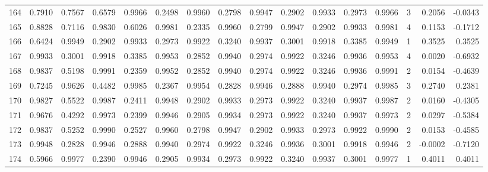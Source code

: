 \begin{tabular}{lrrrrrrrrrrrrrrr}
164 &      0.7910 &  0.7567 &  0.6579 &  0.9966 &  0.2498 &  0.9960 &  0.2798 &  0.9947 &  0.2902 &  0.9933 &   0.2973 &     0.9966 &      3 &                    0.2056 &                    -0.0343 \\
165 &      0.8828 &  0.7116 &  0.9830 &  0.6026 &  0.9981 &  0.2335 &  0.9960 &  0.2799 &  0.9947 &  0.2902 &   0.9933 &     0.9981 &      4 &                    0.1153 &                    -0.1712 \\
166 &      0.6424 &  0.9949 &  0.2902 &  0.9933 &  0.2973 &  0.9922 &  0.3240 &  0.9937 &  0.3001 &  0.9918 &   0.3385 &     0.9949 &      1 &                    0.3525 &                     0.3525 \\
167 &      0.9933 &  0.3001 &  0.9918 &  0.3385 &  0.9953 &  0.2852 &  0.9940 &  0.2974 &  0.9922 &  0.3246 &   0.9936 &     0.9953 &      4 &                    0.0020 &                    -0.6932 \\
168 &      0.9837 &  0.5198 &  0.9991 &  0.2359 &  0.9952 &  0.2852 &  0.9940 &  0.2974 &  0.9922 &  0.3246 &   0.9936 &     0.9991 &      2 &                    0.0154 &                    -0.4639 \\
169 &      0.7245 &  0.9626 &  0.4482 &  0.9985 &  0.2367 &  0.9954 &  0.2828 &  0.9946 &  0.2888 &  0.9940 &   0.2974 &     0.9985 &      3 &                    0.2740 &                     0.2381 \\
170 &      0.9827 &  0.5522 &  0.9987 &  0.2411 &  0.9948 &  0.2902 &  0.9933 &  0.2973 &  0.9922 &  0.3240 &   0.9937 &     0.9987 &      2 &                    0.0160 &                    -0.4305 \\
171 &      0.9676 &  0.4292 &  0.9973 &  0.2399 &  0.9946 &  0.2905 &  0.9934 &  0.2973 &  0.9922 &  0.3240 &   0.9937 &     0.9973 &      2 &                    0.0297 &                    -0.5384 \\
172 &      0.9837 &  0.5252 &  0.9990 &  0.2527 &  0.9960 &  0.2798 &  0.9947 &  0.2902 &  0.9933 &  0.2973 &   0.9922 &     0.9990 &      2 &                    0.0153 &                    -0.4585 \\
173 &      0.9948 &  0.2828 &  0.9946 &  0.2888 &  0.9940 &  0.2974 &  0.9922 &  0.3246 &  0.9936 &  0.3001 &   0.9918 &     0.9946 &      2 &                   -0.0002 &                    -0.7120 \\
174 &      0.5966 &  0.9977 &  0.2390 &  0.9946 &  0.2905 &  0.9934 &  0.2973 &  0.9922 &  0.3240 &  0.9937 &   0.3001 &     0.9977 &      1 &                    0.4011 &                     0.4011 \\

\end{tabular}
